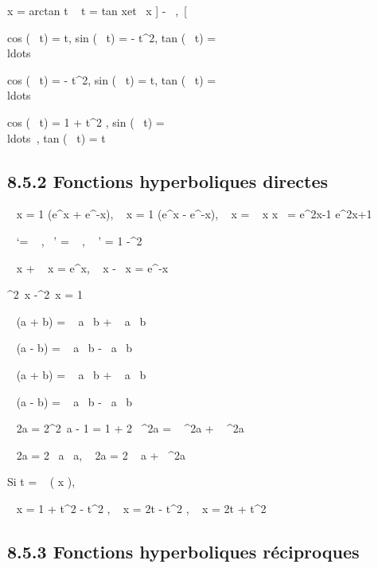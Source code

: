 \documentclass[]{article}
\begin{document}
x = arctan t \mathrel\Leftrightarrow~ t
= tan x\text et ~x \in] -
\pi~,\pi~[

cos (\arccos~ t) = t,
sin (\arccos~ t) =
 - t^2,
tan (\arccos~ t) =
\\ldots~

cos (\arcsin~ t) =
 - t^2,
sin (\arcsin~ t) = t,
tan (\arcsin~ t) =
\\ldots~

cos (\arctan~ t) = 1
\over {} + t^2 ,
sin (\arctan~ t) =
\\ldots~,
tan (\arctan~ t) = t

\subsection{8.5.2 Fonctions hyperboliques directes}

\mathrmch~ x = 1
 (e^x + e^-x),
\mathrmsh~ x = 1
 (e^x - e^-x),
\mathrmth~ x =
\mathrmsh~ x
\over
\mathrmch x~ =
e^2x-1 \over e^2x+1

 \mathrmch~
`= \mathrmsh~ ,
\mathrmsh~'
= \mathrmch~ ,
\mathrmth~ ' = 1
-\mathrmth ^2~

 \mathrmch~ x
+ \mathrmsh~ x =
e^x, \mathrmch~ x
-\mathrmsh~ x =
e^-x

 \mathrmch ^2~x
-\mathrmsh ^2~x =
1

\mathrmch~ (a + b)
= \mathrmch~
a\mathrmch~ b
+ \mathrmsh~
a\mathrmsh~ b

\mathrmch~ (a - b)
= \mathrmch~
a\mathrmch~ b
-\mathrmsh~
a\mathrmsh~ b

\mathrmsh~ (a + b)
= \mathrmsh~
a\mathrmch~ b
+ \mathrmch~
a\mathrmsh~ b

\mathrmsh~ (a - b)
= \mathrmsh~
a\mathrmch~ b
-\mathrmch~
a\mathrmsh~ b

\mathrmch~ 2a =
2\mathrmch ^2~a -
1 = 1 + 2\mathrmsh~
^2a = \mathrmch~
^2a + \mathrmsh~
^2a

\mathrmsh~ 2a =
2\mathrmsh~
a\mathrmch~ a,
\mathrmth~ 2a =
2 \mathrmth~ a
+\mathrmth~
^2a

Si t = \mathrmth~ ( x
 ),

\mathrmch~ x = 1 +
t^2  - t^2 ,
\mathrmsh~ x = 2t
 - t^2 ,
\mathrmth~ x = 2t
 + t^2

\subsection{8.5.3 Fonctions hyperboliques réciproques}
\end{document}

